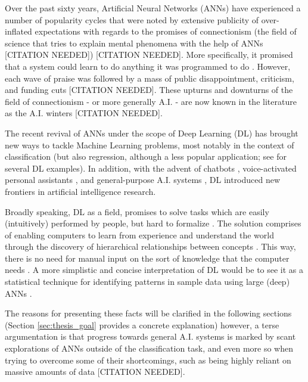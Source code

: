 \documentclass[a4paper]{book}
\begin{document}
Over the past sixty years, Artificial Neural Networks (ANNs) have experienced a number of popularity cycles that were noted by extensive publicity of over-inflated expectations with regards to the promises of connectionism (the field of science that tries to explain mental phenomena with the help of ANNs [CITATION NEEDED]) [CITATION NEEDED]. More specifically, it promised that a system could learn to do anything it was programmed to do \parencite{minsky_perceptrons_1988}. However, each wave of praise was followed by a mass of public disappointment, criticism, and funding cuts [CITATION NEEDED]. These upturns and downturns of the field of connectionism - or more generally A.I. - are now known in the literature as the A.I. winters [CITATION NEEDED].

The recent revival of ANNs under the scope of Deep Learning (DL) has brought new ways to tackle Machine Learning problems, most notably in the context of classification (but also regression, although a less popular application; see \cite{lecun_deep_2015} for several DL examples). In addition, with the advent of chatbots \parencite{dale_return_2016}, voice-activated personal assistants \parencite{xiong_microsoft_2018}, and general-purpose A.I. systems \parencite{vinyals_starcraft_2017}, DL introduced new frontiers in artificial intelligence research.

Broadly speaking, DL as a field, promises to solve tasks which are easily (intuitively) performed by people, but hard to formalize \parencite[e.g., recognizing faces or spoken word;][]{goodfellow_deep_2016}. The solution comprises of enabling computers to learn from experience and understand the world through the discovery of hierarchical relationships between concepts \parencite{lecun_deep_2015}. This way, there is no need for manual input on the sort of knowledge that the computer needs \parencite{goodfellow_deep_2016}. A more simplistic and concise interpretation of DL would be to see it as a statistical technique for identifying patterns in sample data using large (deep) ANNs \parencite{marcus_deep_2018}.

The reasons for presenting these facts will be clarified in the following sections (Section \ref{sec:thesis_goal} provides a concrete explanation) however, a terse argumentation is that progress towards general A.I. systems is marked by scant explorations of ANNs outside of the classification task, and even more so when trying to overcome some of their shortcomings, such as being highly reliant on massive amounts of data [CITATION NEEDED].
\end{document}
